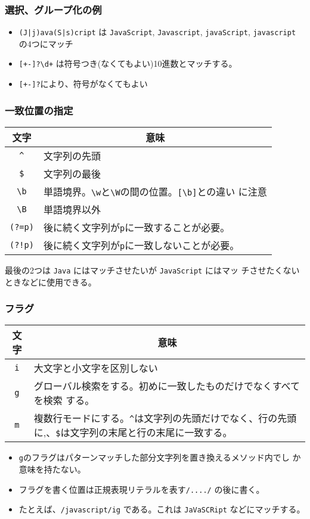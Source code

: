 \documentclass[dvipsk]{beamer}
\begin{document}
\begin{frame}[containsverbatim]
 \frametitle{選択、グループ化の例}
\begin{itemize}\upshape
 \item \verb-(J|j)ava(S|s)cript- は 
\verb-JavaScript-, 
\verb-Javascript-,
\verb-javaScript-,
\verb-javascript- の4つにマッチ
 \item \verb/[+-]?\d+/ は符号つき(なくてもよい)10進数とマッチする。
 \item \verb/[+-]?/により、符号がなくてもよい
\end{itemize}
\end{frame}
\begin{frame}[containsverbatim]
 \frametitle{一致位置の指定}
\begin{center}
 \begin{tabular}{|c|m{}|}\hline
  文字&\multicolumn{1}{c|}{意味}\\\hline
\verb+^+&文字列の先頭\\\hline
\verb+$+&文字列の最後\\\hline
\verb+\b+&単語境界。\verb+\w+と\verb+\W+の間の位置。\verb+[\b]+との違い
      に注意\\\hline
\verb+\B+&単語境界以外\\\hline
\verb+(?=p)+&後に続く文字列が\verb+p+に一致することが必要。\\\hline
\verb+(?!p)+&後に続く文字列が\verb+p+に一致しないことが必要。\\\hline
\end{tabular}
\end{center}
最後の2つは \verb+Java+ にはマッチさせたいが \verb+JavaScript+ にはマッ
チさせたくないときなどに使用できる。
\end{frame}
\begin{frame}[containsverbatim]
 \frametitle{フラグ}
\begin{center} 
 \begin{tabular}{|c|m{}|}\hline
  文字&\multicolumn{1}{c|}{意味}\\\hline
\verb+i+&大文字と小文字を区別しない\\\hline
\verb+g+&グローバル検索をする。初めに一致したものだけでなくすべてを検索
      する。\\\hline
\verb+m+&複数行モードにする。\verb+^+は文字列の先頭だけでなく、行の先頭
      に,、\verb+$+は文字列の末尾と行の末尾に一致する。\\\hline
\end{tabular}
\end{center}
\begin{itemize}
 \item \verb+g+のフラグはパターンマッチした部分文字列を置き換えるメソッド内でし
か意味を持たない。
 \item フラグを書く位置は正規表現リテラルを表す\verb+/..../+ の後に書く。
 \item たとえば、\verb+/javascript/ig+ である。これは \verb+JaVaSCRipt+
       などにマッチする。
\end{itemize}
\end{frame}
\end{document}
